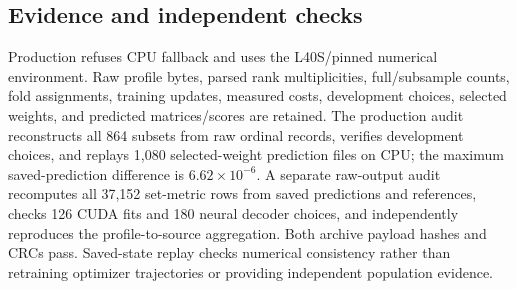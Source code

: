 \subsection{Evidence and independent checks}
Production refuses CPU fallback and uses the L40S/pinned numerical environment. Raw profile bytes, parsed rank multiplicities, full/subsample counts, fold assignments, training updates, measured costs, development choices, selected weights, and predicted matrices/scores are retained. The production audit reconstructs all 864 subsets from raw ordinal records, verifies development choices, and replays 1,080 selected-weight prediction files on CPU; the maximum saved-prediction difference is $6.62\times10^{-6}$. A separate raw-output audit recomputes all 37,152 set-metric rows from saved predictions and references, checks 126 CUDA fits and 180 neural decoder choices, and independently reproduces the profile-to-source aggregation. Both archive payload hashes and CRCs pass. Saved-state replay checks numerical consistency rather than retraining optimizer trajectories or providing independent population evidence.
